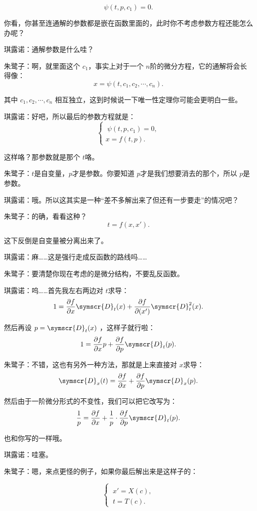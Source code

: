 \documentclass{ctexart}
\begin{document}
\[
    \psi (t,p,c_1)=0
    .\]

你看，你甚至连通解的参数都是嵌在函数里面的，此时你不考虑参数方程还能怎么办呢？

琪露诺：通解参数是什么哇？

朱鹭子：啊，就里面这个 \(c_1\)，事实上对于一个 \(n\)阶的微分方程，它的通解将会长得像：
\[
    x=\psi (t,c_1,c_2,\cdots ,c_n)
    .\]

其中 \(c_1,c_2,\cdots ,c_n\) 相互独立，这到时候说一下唯一性定理你可能会更明白一些。

琪露诺：好吧，所以最后的参数方程就是：
\[
    \begin{cases}
        \\[-2.2em]\
        \psi (t,p,c_1)=0, \\
        x=f(t,p).
    \end{cases}
\]

这样咯？那参数就是那个 \(t\)咯。

朱鹭子：\(t\)是自变量，\(p\)才是参数。你要知道 \(p\)才是我们想要消去的那个，所以 \(p\)是参数。

琪露诺：哦。所以这其实是一种“差不多解出来了但还有一步要走”的情况吧？

朱鹭子：的确，看看这种？
\[
    t=f(x,x')
    .\]

这下反倒是自变量被分离出来了。

琪露诺：麻……这是强行走成反函数的路线吗……

朱鹭子：要清楚你现在考虑的是微分结构，不要乱反函数。

琪露诺：呜……首先我左右两边对 \(t\)求导：
\[
    1=\frac{\partial f}{\partial x}\symscr{D} _t(x)+ \frac{\partial f}{\partial (x')}\symscr{D} _t^2(x)
    .\]

然后再设 \(p=\symscr{D} _t(x)\) ，这样子就行啦：
\[
    1=\frac{\partial f}{\partial x}p+ \frac{\partial f}{\partial p}\symscr{D} _t(p)
    .\]

朱鹭子：不错，这也有另外一种方法，那就是上来直接对 \(x\)求导：
\[
    \symscr{D} _x(t)=\frac{\partial f}{\partial x}+\frac{\partial f}{\partial p}\symscr{D} _x(p)
    .\]

然后由于一阶微分形式的不变性，我们可以把它改写为：
\[
    \frac{1}{p}=\frac{\partial f}{\partial x}+\frac{1}{p}\cdot \frac{\partial f}{\partial p}\symscr{D} _t(p)
    .\]

也和你写的一样哦。

琪露诺：哇塞。

朱鹭子：嗯，来点更怪的例子，如果你最后解出来是这样子的：

\[
    \begin{cases}
        \\[-2.2em]\
        x'=X(c) , \\
        \ t=T(c).
    \end{cases}
\]
\end{document}
